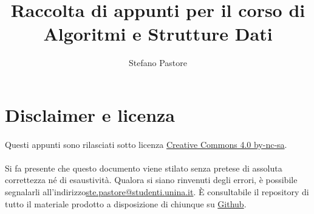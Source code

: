 \documentclass[11pt,a4paper,oneside]{article}
\title{Raccolta di appunti per il corso di\\\Huge{Algoritmi e Strutture Dati}}
\author{Stefano Pastore}
\begin{document}
\maketitle
\pagebreak
\tableofcontents
\pagebreak

\section*{Disclaimer e licenza}
\paragraph*{} Questi appunti sono rilasciati sotto licenza \href{https://creativecommons.org/licenses/by-nc-sa/4.0/}{Creative Commons 4.0 by-nc-sa}.
\paragraph*{} Si fa presente che questo documento viene stilato senza pretese di assoluta correttezza né di esaustività. Qualora si siano rinvenuti degli errori, è possibile segnalarli all'indirizzo\linebreak \href{mailto:ste.pastore@studenti.unina.it}{ste.pastore@studenti.unina.it}. È consultabile il repository di tutto il materiale prodotto a disposizione di chiunque su \href{https://github.com/stefano-pastore/asd}{Github}.
\end{document}
